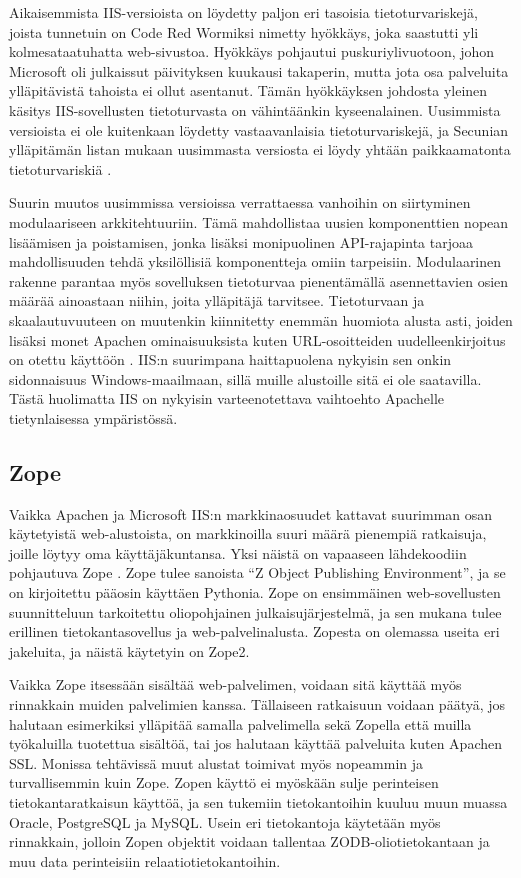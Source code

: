 Aikaisemmista IIS-versioista on löydetty paljon eri tasoisia tietoturvariskejä, joista tunnetuin on Code Red Wormiksi nimetty hyökkäys, joka saastutti yli kolmesataatuhatta web-sivustoa.
Hyökkäys pohjautui puskuriylivuotoon, johon Microsoft oli julkaissut päivityksen kuukausi takaperin, mutta jota osa palveluita ylläpitävistä tahoista ei ollut asentanut. Tämän hyökkäyksen
johdosta yleinen käsitys IIS-sovellusten tietoturvasta on vähintäänkin kyseenalainen. Uusimmista versioista ei ole kuitenkaan löydetty vastaavanlaisia tietoturvariskejä, ja Secunian
ylläpitämän listan mukaan uusimmasta versiosta ei löydy yhtään paikkaamatonta tietoturvariskiä \cite{Secunia}.

Suurin muutos uusimmissa versioissa verrattaessa vanhoihin on siirtyminen modulaariseen arkkitehtuuriin. Tämä mahdollistaa uusien komponenttien nopean lisäämisen ja poistamisen, jonka lisäksi  
monipuolinen API-rajapinta tarjoaa mahdollisuuden tehdä yksilöllisiä komponentteja omiin tarpeisiin. Modulaarinen rakenne parantaa myös sovelluksen tietoturvaa pienentämällä asennettavien 
osien määrää ainoastaan niihin, joita ylläpitäjä tarvitsee. Tietoturvaan ja skaalautuvuuteen on muutenkin kiinnitetty enemmän huomiota alusta asti, joiden lisäksi monet Apachen ominaisuuksista
kuten URL-osoitteiden uudelleenkirjoitus on otettu käyttöön \cite{IIS}. IIS:n suurimpana haittapuolena nykyisin sen onkin sidonnaisuus Windows-maailmaan, sillä muille alustoille sitä ei ole 
saatavilla. Tästä huolimatta IIS on nykyisin varteenotettava vaihtoehto Apachelle tietynlaisessa ympäristössä. 

\subsection{Zope}

Vaikka Apachen ja Microsoft IIS:n markkinaosuudet kattavat suurimman osan käytetyistä web-alustoista, on markkinoilla suuri määrä pienempiä ratkaisuja, joille löytyy oma käyttäjäkuntansa. Yksi 
näistä on vapaaseen lähdekoodiin pohjautuva Zope \cite{Zope}. Zope tulee sanoista ``Z Object Publishing Environment'', ja se on kirjoitettu pääosin käyttäen Pythonia. Zope on ensimmäinen
web-sovellusten suunnitteluun tarkoitettu oliopohjainen julkaisujärjestelmä, ja sen mukana tulee erillinen tietokantasovellus ja web-palvelinalusta. Zopesta on olemassa useita eri jakeluita, ja 
näistä käytetyin on Zope2. 

Vaikka Zope itsessään sisältää web-palvelimen, voidaan sitä käyttää myös rinnakkain muiden palvelimien kanssa. Tällaiseen ratkaisuun voidaan päätyä, jos halutaan esimerkiksi ylläpitää samalla
palvelimella sekä Zopella että muilla työkaluilla tuotettua sisältöä, tai jos halutaan käyttää palveluita kuten Apachen SSL. Monissa tehtävissä muut alustat toimivat myös nopeammin ja 
turvallisemmin kuin Zope. Zopen käyttö ei myöskään sulje perinteisen tietokantaratkaisun käyttöä, ja sen tukemiin tietokantoihin kuuluu muun muassa Oracle, PostgreSQL ja MySQL. Usein eri 
tietokantoja käytetään myös rinnakkain, jolloin Zopen objektit voidaan tallentaa ZODB-oliotietokantaan ja muu data perinteisiin relaatiotietokantoihin. 


